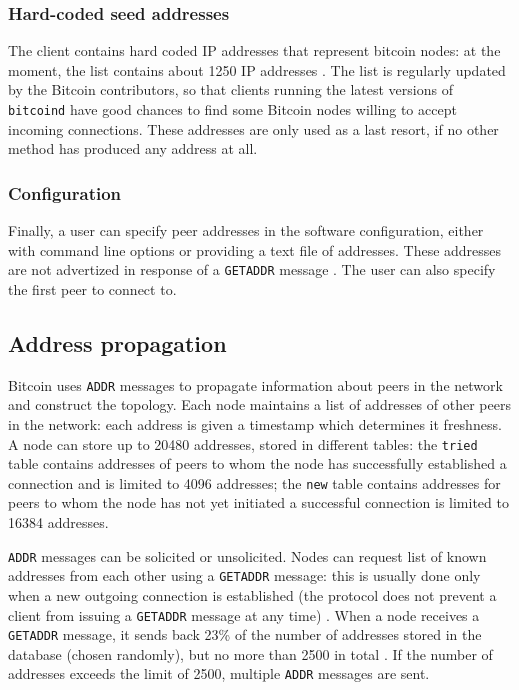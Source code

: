 \subsubsection{Hard-coded seed addresses}
The client contains hard coded IP addresses that represent bitcoin nodes:
at the moment, the list contains about \num{1250} IP addresses \cite{bitcoin_seeds}.
The list is regularly updated by the Bitcoin contributors, so that clients running the latest versions of \texttt{bitcoind} have good chances to find some Bitcoin nodes willing to accept incoming connections.
These addresses are only used as a last resort, if no other method has produced any address at all.

\subsubsection{Configuration}
Finally, a user can specify peer addresses in the software configuration, either with command line options or providing a text file of addresses.
These addresses are not advertized in response of a \texttt{GETADDR} message \cite{bitcoin_peer_discovery}.
The user can also specify the first peer to connect to.

\subsection{Address propagation}
\label{sub:address-propagation}
Bitcoin uses \texttt{ADDR} messages to propagate information about peers in the network and construct the topology.
Each node maintains a list of addresses of other peers in the network:
each address is given a timestamp which determines it freshness.
A node can store up to \num{20480} addresses, stored in different tables:
the \texttt{tried} table contains addresses of peers to whom the node has successfully established a connection and is limited to \num{4096} addresses;
the \texttt{new} table contains addresses for peers to whom the node has not yet initiated a successful connection is limited to \num{16384} addresses.

\texttt{ADDR} messages can be solicited or unsolicited.
Nodes can request list of known addresses from each other using a \texttt{GETADDR} message:
this is usually done only when a new outgoing connection is established (the protocol does not prevent a client from issuing a \texttt{GETADDR} message at any time) \cite{eclipse_attack_2015}.
When a node receives a \texttt{GETADDR} message, it sends back \num{23}\% of the number of addresses stored in the database (chosen randomly), but no more than \num{2500} in total \cite{deanonymisation_2014}.
If the number of addresses exceeds the limit of \num{2500}, multiple \texttt{ADDR} messages are sent.

